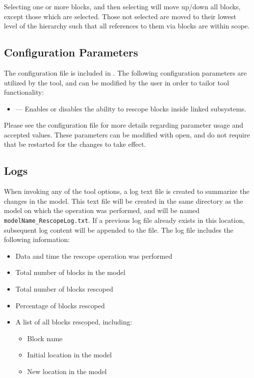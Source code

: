 \documentclass{article}
\newcommand{\menu}[2]{%
	\ifthenelse{\equal{#1}{1}}{Rescope All}{}%
  	\ifthenelse{\equal{#1}{2}}{Rescope Selected}{}%
  	\ifthenelse{\equal{#1}{3}}{Rescope Non-Selected}{}%
}
\newcommand{\toolFolder}{\cmd{DataStoreRescope}}
\begin{document}
\subsubsection*{}
Selecting one or more \DSM blocks, and then selecting  will move up/down all \DSM blocks, except those which are selected. Those not selected are moved to their lowest level of the hierarchy such that all references to them via \DSRW blocks are within scope.

\subsection{Configuration Parameters}
The configuration file  is included in \cmd{\toolFolder\textbackslash src}. The following configuration parameters are utilized by the tool, and can be modified by the user in order to tailor tool functionality:

\begin{itemize}
	\item {} --- Enables or disables the ability to rescope \DSM blocks inside linked subsystems.
\end{itemize}

Please see the configuration file for more details regarding parameter usage and accepted values. These parameters can be modified with \matlab open, and do not require that \matlab be restarted for the changes to take effect.

\subsection{Logs}
When invoking any of the tool options, a log text file is created to summarize the changes in the model. This text file will be created in the same directory as the model on which the operation was performed, and will be named \texttt{modelName\_RescopeLog.txt}. If a previous log file already exists in this location, subsequent log content will be appended to the file. The log file includes the following information:

\begin{itemize}
	\item Data and time the rescope operation was performed
	\item Total number of \DSM blocks in the model
	\item Total number of \DSM blocks rescoped
	\item Percentage of \DSM blocks rescoped
	\item A list of all \DSM blocks rescoped, including:
	\begin{itemize}
		\item Block name
		\item Initial location in the model
		\item New location in the model
	\end{itemize}
\end{itemize}
\end{document}
